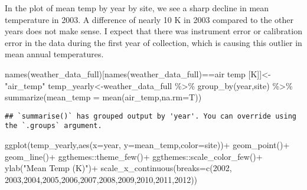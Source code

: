 \documentclass[
]{book}
\newenvironment{Shaded}{\begin{snugshade}}{\end{snugshade}}
\newcommand{\AttributeTok}[1]{\textcolor[rgb]{0.77,0.63,0.00}{#1}}
\newcommand{\DecValTok}[1]{\textcolor[rgb]{0.00,0.00,0.81}{#1}}
\newcommand{\FunctionTok}[1]{\textcolor[rgb]{0.00,0.00,0.00}{#1}}
\newcommand{\NormalTok}[1]{#1}
\newcommand{\OtherTok}[1]{\textcolor[rgb]{0.56,0.35,0.01}{#1}}
\newcommand{\SpecialCharTok}[1]{\textcolor[rgb]{0.00,0.00,0.00}{#1}}
\newcommand{\StringTok}[1]{\textcolor[rgb]{0.31,0.60,0.02}{#1}}
\begin{document}
In the plot of mean temp by year by site, we see a sharp decline in mean temperature in 2003. A difference of nearly 10 K in 2003 compared to the other years does not make sense. I expect that there was instrument error or calibration error in the data during the first year of collection, which is causing this outlier in mean annual temperatures.

\begin{Shaded}
\begin{Highlighting}[]
\FunctionTok{names}\NormalTok{(weather\_data\_full)[}\FunctionTok{names}\NormalTok{(weather\_data\_full)}\SpecialCharTok{==}\StringTok{\textquotesingle{}air temp [K]\textquotesingle{}}\NormalTok{]}\OtherTok{\textless{}{-}}\StringTok{"air\_temp"}
\NormalTok{temp\_yearly}\OtherTok{\textless{}{-}}\NormalTok{weather\_data\_full }\SpecialCharTok{\%\textgreater{}\%}
  \FunctionTok{group\_by}\NormalTok{(year,site) }\SpecialCharTok{\%\textgreater{}\%} 
  \FunctionTok{summarize}\NormalTok{(}\AttributeTok{mean\_temp =} \FunctionTok{mean}\NormalTok{(air\_temp,}\AttributeTok{na.rm=}\NormalTok{T))}
\end{Highlighting}
\end{Shaded}

\begin{verbatim}
## `summarise()` has grouped output by 'year'. You can override using the `.groups` argument.
\end{verbatim}

\begin{Shaded}
\begin{Highlighting}[]
\FunctionTok{ggplot}\NormalTok{(temp\_yearly,}\FunctionTok{aes}\NormalTok{(}\AttributeTok{x=}\NormalTok{year, }\AttributeTok{y=}\NormalTok{mean\_temp,}\AttributeTok{color=}\NormalTok{site))}\SpecialCharTok{+}
  \FunctionTok{geom\_point}\NormalTok{()}\SpecialCharTok{+}
  \FunctionTok{geom\_line}\NormalTok{()}\SpecialCharTok{+}
\NormalTok{  ggthemes}\SpecialCharTok{::}\FunctionTok{theme\_few}\NormalTok{()}\SpecialCharTok{+}
\NormalTok{  ggthemes}\SpecialCharTok{::}\FunctionTok{scale\_color\_few}\NormalTok{()}\SpecialCharTok{+}
  \FunctionTok{ylab}\NormalTok{(}\StringTok{"Mean Temp (K)"}\NormalTok{)}\SpecialCharTok{+}
  \FunctionTok{scale\_x\_continuous}\NormalTok{(}\AttributeTok{breaks=}\FunctionTok{c}\NormalTok{(}\DecValTok{2002}\NormalTok{, }\DecValTok{2003}\NormalTok{,}\DecValTok{2004}\NormalTok{,}\DecValTok{2005}\NormalTok{,}\DecValTok{2006}\NormalTok{,}\DecValTok{2007}\NormalTok{,}\DecValTok{2008}\NormalTok{,}\DecValTok{2009}\NormalTok{,}\DecValTok{2010}\NormalTok{,}\DecValTok{2011}\NormalTok{,}\DecValTok{2012}\NormalTok{))}
\end{Highlighting}
\end{Shaded}
\end{document}
